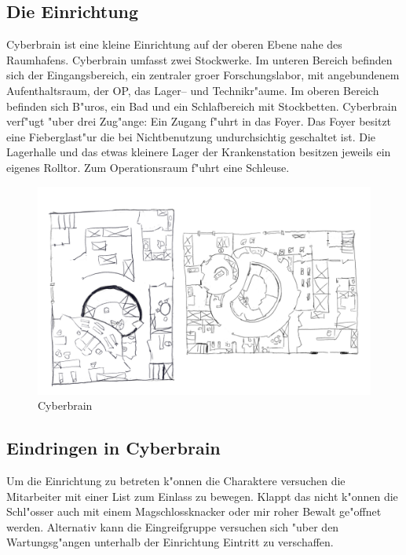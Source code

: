 \subsection{Die Einrichtung} 
Cyberbrain ist eine kleine Einrichtung auf der oberen Ebene nahe des Raumhafens. Cyberbrain umfasst zwei Stockwerke. Im unteren Bereich befinden sich der Eingangsbereich, ein zentraler gro\3er Forschungslabor, mit angebundenem Aufenthaltsraum, der OP, das Lager-- und Technikr"aume. Im oberen Bereich befinden sich B"uros, ein Bad und ein Schlafbereich mit Stockbetten. Cyberbrain verf"ugt "uber drei Zug"ange: Ein Zugang f"uhrt in das Foyer. Das Foyer besitzt eine Fieberglast"ur die bei Nichtbenutzung undurchsichtig geschaltet ist. Die Lagerhalle und das etwas kleinere Lager der Krankenstation besitzen jeweils ein eigenes Rolltor. Zum Operationsraum f"uhrt eine Schleuse.

\begin{figure}
    \includegraphics[width=0.9\linewidth]{./images/cyberbrain.png}
    \caption{Cyberbrain}
\end{figure}

\subsection{Eindringen in Cyberbrain} 
Um die Einrichtung zu betreten k"onnen die Charaktere versuchen die Mitarbeiter mit einer List zum Einlass zu bewegen. Klappt das nicht k"onnen die Schl"osser auch mit einem Magschlossknacker oder mir roher Bewalt ge"offnet werden. Alternativ kann die Eingreifgruppe versuchen sich "uber den Wartungsg"angen unterhalb der Einrichtung Eintritt zu verschaffen.

